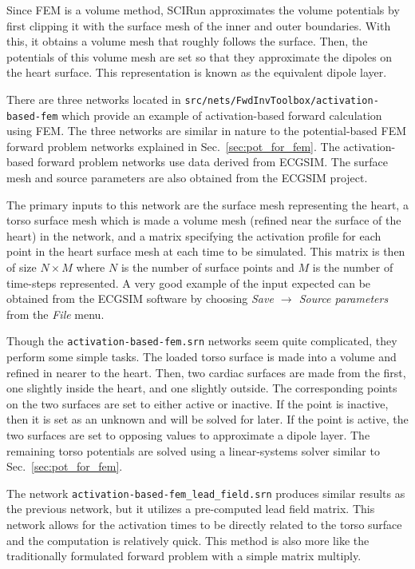 Since FEM is a volume method, SCIRun approximates the volume potentials
by first clipping it with the surface mesh of the inner and outer boundaries.
With this, it obtains a volume mesh that roughly follows the surface. Then, the
potentials of this volume mesh are set so that they approximate the dipoles
on the heart surface. This representation is known as the equivalent dipole
layer.

There are three networks located in {\tt  src/nets/FwdInvToolbox/activation-based-fem}
which provide an example of activation-based forward calculation
using FEM. The three networks are similar in nature to the potential-based
FEM forward problem networks explained in Sec.~\ref{sec:pot_for_fem}.
The activation-based forward problem networks use data derived from ECGSIM.
The surface mesh and source parameters are also obtained from the ECGSIM
project.

The primary inputs to this network are the surface mesh representing
the heart, a torso surface mesh which is made a volume mesh
(refined near the surface of the heart) in the network, and
a matrix specifying the activation profile for each point in the heart
surface mesh at each time to be simulated. This matrix is then of size
$N \times M$ where $N$ is the number of surface points and $M$ is the
number of time-steps represented. A very good example of the input
expected can be obtained from the ECGSIM software by choosing {\em
Save $\rightarrow$ Source parameters} from the {\em File} menu.

Though the {\tt activation-based-fem.srn} networks seem quite complicated,
they perform some simple tasks. The loaded torso surface is made into a
volume and refined in nearer to the heart. Then, two cardiac surfaces are
made from the first, one slightly inside the heart, and one slightly outside.
The corresponding points on the two surfaces are set to either active or inactive.
If the point is inactive, then it is set as an unknown and will be solved for later. If
the point is active, the two surfaces are set to opposing values to approximate a
dipole layer. The remaining torso potentials are solved using a linear-systems
solver similar to Sec.~\ref{sec:pot_for_fem}.

The network {\tt activation-based-fem\_lead\_field.srn} produces similar results
as the previous network, but it utilizes a pre-computed lead field matrix. This
network allows for the activation times to be directly related to the torso surface
and the computation is relatively quick. This method is also more like the
traditionally formulated forward problem with a simple matrix multiply.

